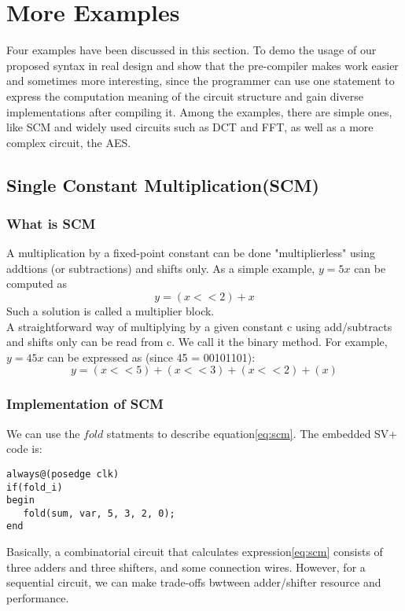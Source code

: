 \section{More Examples}
Four examples have been discussed in this section. To demo the usage of our proposed syntax in real design and show that the pre-compiler makes work easier and sometimes more interesting, since the programmer can use one statement to express the computation meaning of the circuit structure and gain diverse implementations after compiling it. Among the examples, there are simple ones, like SCM\cite{SCM} and widely used circuits such as DCT and FFT, as well as a more complex circuit, the AES\cite{AES}.
\subsection{Single Constant Multiplication(SCM)}
\subsubsection{What is SCM}
A multiplication by a fixed-point constant can be done "multiplierless" using addtions (or subtractions) and shifts only. As a simple example, 
\begin{math}
y = 5x
\end{math}
can be computed as
\begin{equation}
y = (x<<2) + x
\end{equation}
Such a solution is called a multiplier block.\\
A straightforward way of multiplying by a given constant c using add/subtracts and shifts only can be read from c. We call it the binary method. For example, 
\begin{math}
y = 45x
\end{math}
can be expressed as (since 45 = 00101101):
\begin{equation}
y = (x<<5) + (x<<3) + (x<<2) + (x)
\label{eq:scm}
\end{equation}
\subsubsection{Implementation of SCM}
We can use the $fold$ statments to describe equation\eqref{eq:scm}. The embedded SV+ code is:
\begin{verbatim}
always@(posedge clk)
if(fold_i)
begin
   fold(sum, var, 5, 3, 2, 0);
end
\end{verbatim}
Basically, a combinatorial circuit that calculates expression\eqref{eq:scm} consists of three adders and three shifters, and some connection wires. However, for a sequential circuit, we can make trade-offs bwtween adder/shifter resource and performance. 

